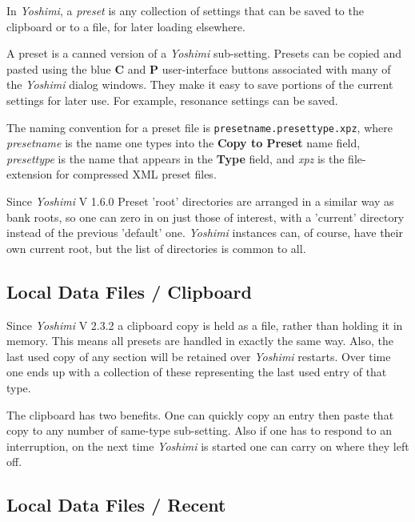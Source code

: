   In \textsl{Yoshimi}, a
   \textsl{preset} is any collection of settings that can be saved to the
   clipboard or to a file, for later loading elsewhere.

   A preset is a canned version of a \textsl{Yoshimi} sub-setting.  Presets can be
   copied and pasted using the blue \textbf{C} and \textbf{P} user-interface
   buttons associated with many of the \textsl{Yoshimi} dialog windows.  They
   make it easy to save portions of the current settings for later use.  For
   example, resonance settings can be saved.

   The naming convention for a preset file is
   \texttt{presetname.presettype.xpz}, where
   \textsl{presetname} is the name one types into the \textbf{Copy to Preset}
   name field, \textsl{presettype} is the name that appears in the
   \textbf{Type} field, and \textsl{xpz} is the file-extension for compressed
   XML preset files.

   Since \textsl{Yoshimi} V 1.6.0 Preset 'root' directories are arranged in a
   similar way as bank roots, so one can zero in on just those of interest,
   with a 'current' directory instead of the previous 'default' one.
   \textsl{Yoshimi} instances can, of course, have their own current root, but
   the list of directories is common to all.

\subsection{Local Data Files / Clipboard}
\label{subsec:local_data_clipboard}

   Since \textsl{Yoshimi} V 2.3.2 a clipboard copy is held as a file, rather
   than holding it in memory. This means all presets are handled in exactly the
   same way. Also, the last used copy of any section will be retained over
   \textsl{Yoshimi} restarts. Over time one ends up with a collection of these
   representing the last used entry of that type.

   The clipboard has two benefits. One can quickly copy an entry then paste that
   copy to any number of same-type sub-setting. Also if one has to respond to an
   interruption, on the next time \textsl{Yoshimi} is started one can carry on
   where they left off.

\subsection{Local Data Files / Recent}
\label{subsec:local_data_recent}

